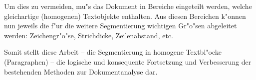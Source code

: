 
Um dies zu vermeiden, mu"s das Dokument in Bereiche eingeteilt werden, welche gleichartige
(homogenen) Textobjekte enthalten. Aus diesen Bereichen k"onnen nun jeweils die f"ur die
weitere Segmentierung wichtigen Gr"o"sen abgeleitet werden: Zeichengr"o"se, Strichdicke,
Zeilenabstand, etc.

Somit stellt diese Arbeit -- die Segmentierung in homogene Textbl"ocke (Paragraphen) --
die logische und konsequente Fortsetzung und Verbesserung der bestehenden Methoden zur
Dokumentanalyse dar.

